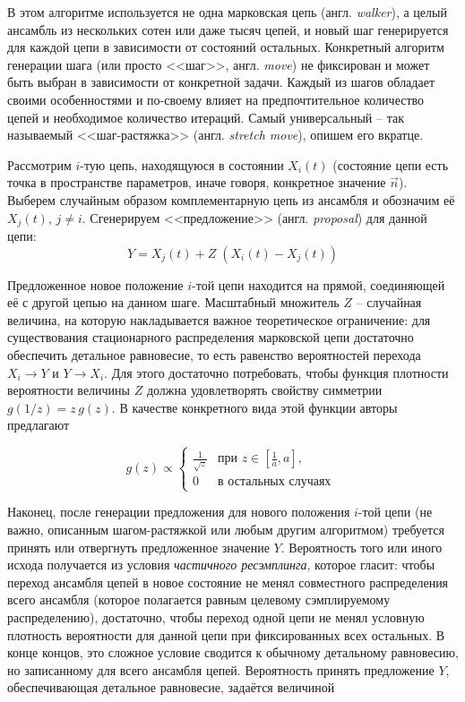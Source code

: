В этом алгоритме используется не одна марковская цепь (англ. \textit{walker}), а целый ансамбль из нескольких сотен или даже тысяч цепей, и новый шаг генерируется для каждой цепи в зависимости от состояний остальных. Конкретный алгоритм генерации шага (или просто <<шаг>>, англ. \textit{move}) не фиксирован и может быть выбран в зависимости от конкретной задачи. Каждый из шагов обладает своими особенностями и по-своему влияет на предпочтительное количество цепей и необходимое количество итераций. Самый универсальный -- так называемый <<шаг-растяжка>> (англ. \textit{stretch move}), опишем его вкратце.

Рассмотрим $i$-тую цепь, находящуюся в состоянии $X_i(t)$ (состояние цепи есть точка в пространстве параметров, иначе говоря, конкретное значение $\vec{n}$). Выберем случайным образом комплементарную цепь из ансамбля и обозначим её $X_j(t)$, $j \neq i$. Сгенерируем <<предложение>> (англ. \textit{proposal}) для данной цепи:
\begin{equation}
	\label{eq:gw2010-stretch-move}
	Y = X_j(t) + Z \; (X_i(t) - X_j(t))
\end{equation}

Предложенное новое положение $i$-той цепи находится на прямой, соединяющей её с другой цепью на данном шаге. Масштабный множитель $Z$ -- случайная величина, на которую накладывается важное теоретическое ограничение: для существования стационарного распределения марковской цепи достаточно обеспечить детальное равновесие, то есть равенство вероятностей перехода $X_i \rightarrow Y$ и $Y \rightarrow X_i$. Для этого достаточно потребовать, чтобы функция плотности вероятности величины $Z$ должна удовлетворять свойству симметрии $g(1 / z) = z \, g(z)$. В качестве конкретного вида этой функции авторы предлагают 

\begin{equation}
	g(z) \propto \begin{cases}
		\frac{1}{\sqrt{z}}& \text{при } z \in \left[\frac{1}{a}, a\right], \\
		0& \text{в остальных случаях }
	\end{cases}
\end{equation}

Наконец, после генерации предложения для нового положения $i$-той цепи (не важно, описанным шагом-растяжкой или любым другим алгоритмом) требуется принять или отвергнуть предложенное значение $Y$. Вероятность того или иного исхода получается из условия \textit{частичного ресэмплинга}, которое гласит: чтобы переход ансамбля цепей в новое состояние не менял совместного распределения всего ансамбля (которое полагается равным целевому сэмплируемому распределению), достаточно, чтобы переход одной цепи не менял условную плотность вероятности для данной цепи при фиксированных всех остальных. В конце концов, это сложное условие сводится к обычному детальному равновесию, но записанному для всего ансамбля цепей. Вероятность принять предложение $Y$, обеспечивающая детальное равновесие, задаётся величиной

